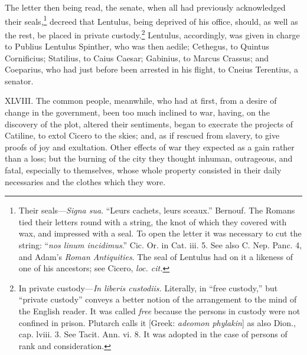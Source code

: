The letter then being read, the senate, when all had previously
acknowledged their seals,\footnote{Their seals—\emph{Signa sua}. ``Leurs cachets, leurs sceaux.''
Bernouf. The Romans tied their letters round with a string, the knot
of which they covered with wax, and impressed with a seal. To open the
letter it was necessary to cut the string: ``\emph{nos linum incidimus}.''
Cic. Or. in Cat. iii. 5. See also C. Nep. Panc. 4, and Adam's \emph{Roman
Antiquities}. The seal of Lentulus had on it a likeness of one of his
ancestors; see Cicero, \emph{loc. cit.}} decreed that Lentulus, being deprived
of his office, should, as well as the rest, be placed in private
custody.\footnote{In private custody—\emph{In liberis custodiis.} Literally, in
``free custody,'' but ``private custody'' conveys a better notion of the
arrangement to the mind of the English reader. It was called \emph{free}
because the persons in custody were not confined in prison. Plutarch
calls it [Greek: \emph{adeomon phylakin}] as also Dion., cap. lviii. 3. See
Tacit. Ann. vi. 8. It was adopted in the case of persons of rank and
consideration.} Lentulus, accordingly, was given in charge to Publius
Lentulus Spinther, who was then aedile; Cethegus, to Quintus
Cornificius; Statilius, to Caius Caesar; Gabinius, to Marcus Crassus;
and Coeparius, who had just before been arrested in his flight, to
Cneius Terentius, a senator.

XLVIII. The common people, meanwhile, who had at first, from a desire
of change in the government, been too much inclined to war, having, on
the discovery of the plot, altered their sentiments, began to execrate
the projects of Catiline, to extol Cicero to the skies; and, as if
rescued from slavery, to give proofs of joy and exultation. Other
effects of war they expected as a gain rather than a loss; but the
burning of the city they thought inhuman, outrageous, and fatal,
especially to themselves, whose whole property consisted in their
daily necessaries and the clothes which they wore.

